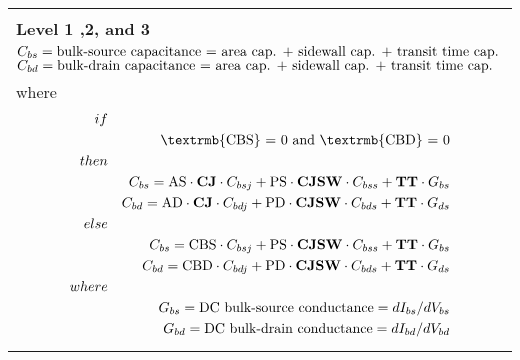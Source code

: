 


\small
\begin{longtable}[H]{>{\setlength{\hsize}{\textwidth}}W}
\hline \\
\bf Level 1 ,2, and 3 \\

$C_{bs} = \mbox{\rm bulk-source capacitance =  area cap. +
sidewall cap. + transit time cap.}$
$C_{bd} = \mbox{\rm bulk-drain capacitance = area cap. + sidewall
cap. + transit time cap.}$ \\
where
\begin{eqnarray*}
if && \\
&&\mbox{\textrmb{CBS} = 0 \textit{\rm and} \textrmb{CBD} = 0} \\
then && \\
&& C_{bs} = \mathrm{AS}\cdot \mathbf{CJ}\cdot C_{bsj} +
\mathrm{PS}\cdot \mathbf{CJSW}\cdot C_{bss} + \mathbf{TT}\cdot
G_{bs} \\
&& C_{bd} = \mathrm{AD}\cdot \mathbf{CJ}\cdot C_{bdj} +
\mathrm{PD}\cdot \mathbf{CJSW}\cdot C_{bds} + \mathbf{TT}\cdot
G_{ds} \\
else && \\
&& C_{bs} = \mathrm{CBS}\cdot C_{bsj} + \mathrm{PS}\cdot
\mathbf{CJSW}\cdot C_{bss} + \mathbf{TT}\cdot G_{bs} \\
&& C_{bd} = \mathrm{CBD}\cdot C_{bdj} + \mathrm{PD}\cdot
\mathbf{CJSW}\cdot C_{bds} + \mathbf{TT}\cdot G_{ds} \\
where && \\
&& G_{bs} = \mbox{\rm DC bulk-source conductance} =
dI_{bs}/dV_{bs}\\
&& G_{bd} = \mbox{\rm DC bulk-drain conductance} =
dI_{bd}/dV_{bd}
\end{eqnarray*}


\end{longtable}
